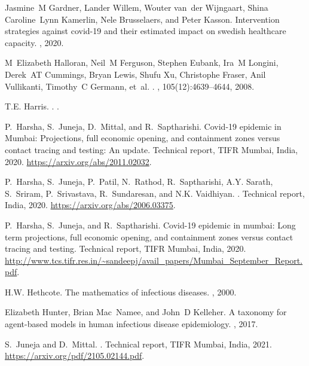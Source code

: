 \documentclass{article}
\theoremstyle{definition}
\begin{document}
\begin{thebibliography}{10}
Jasmine~M Gardner, Lander Willem, Wouter van~der Wijngaart, Shina Caroline~Lynn
  Kamerlin, Nele Brusselaers, and Peter Kasson.
\newblock Intervention strategies against covid-19 and their estimated impact
  on swedish healthcare capacity.
, 2020.

M~Elizabeth Halloran, Neil~M Ferguson, Stephen Eubank, Ira~M Longini, Derek~AT
  Cummings, Bryan Lewis, Shufu Xu, Christophe Fraser, Anil Vullikanti,
  Timothy~C Germann, et~al.
.
,
  105(12):4639--4644, 2008.

T.E. Harris.
.
.

P.~Harsha, S.~Juneja, D.~Mittal, and R.~Saptharishi.
\newblock Covid-19 epidemic in {Mumbai}: Projections, full economic opening,
  and containment zones versus contact tracing and testing: An update.
\newblock Technical report, TIFR Mumbai, India, 2020.
\newblock \url{https://arxiv.org/abs/2011.02032}.

P.~Harsha, S.~Juneja, P.~Patil, N.~Rathod, R.~Saptharishi, A.Y. Sarath,
  S.~Sriram, P.~Srivastava, R.~Sundaresan, and N.K. Vaidhiyan.
.
\newblock Technical report, India, 2020.
\newblock \url{https://arxiv.org/abs/2006.03375}.

P.~Harsha, S.~Juneja, and R.~Saptharishi.
\newblock Covid-19 epidemic in mumbai: Long term projections, full economic
  opening, and containment zones versus contact tracing and testing.
\newblock Technical report, TIFR Mumbai, India, 2020.
\newblock
  \url{http://www.tcs.tifr.res.in/~sandeepj/avail_papers/Mumbai_September_Report.pdf}.

H.W. Hethcote.
\newblock The mathematics of infectious diseases.
, 2000.

Elizabeth Hunter, Brian Mac~Namee, and John~D Kelleher.
\newblock A taxonomy for agent-based models in human infectious disease
  epidemiology.
, 2017.

S.~Juneja and D.~Mittal.
.
\newblock Technical report, TIFR Mumbai, India, 2021.
\newblock \url{https://arxiv.org/pdf/2105.02144.pdf}.


\end{thebibliography}
\end{document}
